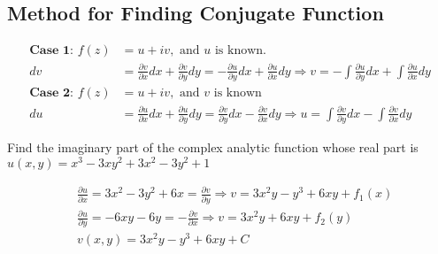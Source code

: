 \begin{note}
	\subsection{Method for Finding Conjugate Function }
		\begin{align*}
		\textbf{Case 1: }f(z)&=u+i v,\text{ and $u$ is known.}\\
		d v&=\frac{\partial v}{\partial x} d x+\frac{\partial v}{\partial y} d y=-\frac{\partial u}{\partial y} d x+\frac{\partial u}{\partial x} d y \Rightarrow v=-\int \frac{\partial u}{\partial y} d x+\int \frac{\partial u}{\partial x} d y\\
		\textbf{Case 2: }f(z)&=u+i v,\text{ and $v$ is known}\\
		d u&=\frac{\partial u}{\partial x} d x+\frac{\partial u}{\partial y} d y=\frac{\partial v}{\partial y} d x-\frac{\partial v}{\partial x} d y \Rightarrow u=\int \frac{\partial v}{\partial y} d x-\int \frac{\partial v}{\partial x} d y
		\end{align*}
	\begin{exercise}
		 Find the imaginary part of the complex analytic function whose real part is $u(x, y)=x^{3}-3 x y^{2}+3 x^{2}-3 y^{2}+1$
	\end{exercise}
	\begin{answer}
		\begin{align*}
		&\frac{\partial u}{\partial x}=3 x^{2}-3 y^{2}+6 x=\frac{\partial v}{\partial y} \Rightarrow v=3 x^{2} y-y^{3}+6 x y+f_{1}(x) \\
		&\frac{\partial u}{\partial y}=-6 x y-6 y=-\frac{\partial v}{\partial x} \Rightarrow v=3 x^{2} y+6 x y+f_{2}(y) \\
		&v(x, y)=3 x^{2} y-y^{3}+6 x y+C
		\end{align*}
	\end{answer}

\end{note}
